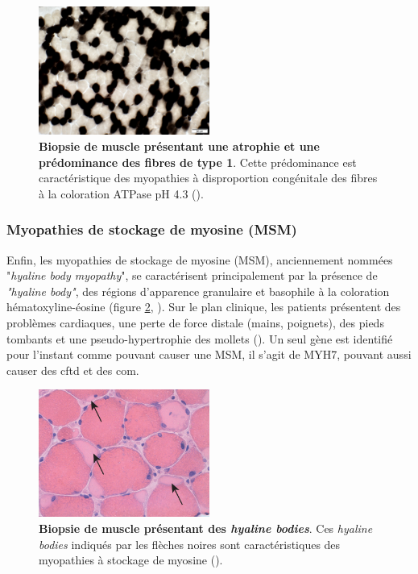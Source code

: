 \begin{figure}[htbp]
 \centering
 \includegraphics[width=0.5\textwidth]{figures/cftd.jpg}
 \caption[Biopsie de muscle de myopathie à disproportion congénitale des fibres]{\textbf{Biopsie de muscle présentant une atrophie et une prédominance des fibres de type 1}. Cette prédominance est caractéristique des myopathies à disproportion congénitale des fibres à la coloration ATPase pH 4.3 (\cite{alan_pestronk_neuromuscular_2022}).}
 \label{fig:cftd}
\end{figure}

\subsubsection{Myopathies de stockage de myosine (MSM)}
Enfin, les myopathies de stockage de myosine (MSM), anciennement nommées "\textit{hyaline body myopathy}", se caractérisent principalement par la présence de \textit{"hyaline body"}, des régions d'apparence granulaire et basophile à la coloration hématoxyline-éosine (figure \ref{fig:hyaline}, \cite{claeys_congenital_2020, victor_dubowitz_muscle_2020}). Sur le plan clinique, les patients présentent des problèmes cardiaques, une perte de force distale (mains, poignets), des pieds tombants et une pseudo-hypertrophie des mollets (\cite{cassandrini_congenital_2017}). Un seul gène est identifié pour l'instant comme pouvant causer une MSM, il s'agit de MYH7, pouvant aussi causer des \gls{cftd} et des \gls{com}.

\begin{figure}[htbp]
 \centering
 \includegraphics[width=0.5\textwidth]{figures/hyalin.jpg}
 \caption[Biopsie de muscle des \textit{hyaline bodies}]{\textbf{Biopsie de muscle présentant des \textit{hyaline bodies}}. Ces \textit{hyaline bodies} indiqués par les flèches noires sont caractéristiques des myopathies à stockage de myosine (\cite{victor_dubowitz_muscle_2020}).}
 \label{fig:hyaline}
\end{figure}

